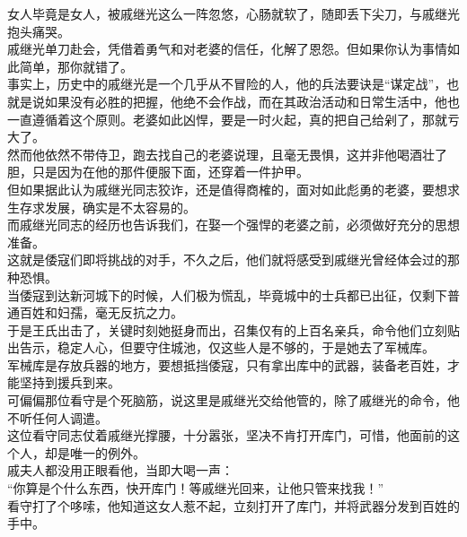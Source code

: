 \begin{multicols}{\theparacolNo}
女人毕竟是女人，被戚继光这么一阵忽悠，心肠就软了，随即丢下尖刀，与戚继光抱头痛哭。\\

戚继光单刀赴会，凭借着勇气和对老婆的信任，化解了恩怨。但如果你认为事情如此简单，那你就错了。\\

事实上，历史中的戚继光是一个几乎从不冒险的人，他的兵法要诀是“谋定战”，也就是说如果没有必胜的把握，他绝不会作战，而在其政治活动和日常生活中，他也一直遵循着这个原则。老婆如此凶悍，要是一时火起，真的把自己给剁了，那就亏大了。\\

然而他依然不带侍卫，跑去找自己的老婆说理，且毫无畏惧，这并非他喝酒壮了胆，只是因为在他的那件便服下面，还穿着一件护甲。\\

但如果据此认为戚继光同志狡诈，还是值得商榷的，面对如此彪勇的老婆，要想求生存求发展，确实是不太容易的。\\

而戚继光同志的经历也告诉我们，在娶一个强悍的老婆之前，必须做好充分的思想准备。\\

这就是倭寇们即将挑战的对手，不久之后，他们就将感受到戚继光曾经体会过的那种恐惧。\\

当倭寇到达新河城下的时候，人们极为慌乱，毕竟城中的士兵都已出征，仅剩下普通百姓和妇孺，毫无反抗之力。\\

于是王氏出击了，关键时刻她挺身而出，召集仅有的上百名亲兵，命令他们立刻贴出告示，稳定人心，但要守住城池，仅这些人是不够的，于是她去了军械库。\\

军械库是存放兵器的地方，要想抵挡倭寇，只有拿出库中的武器，装备老百姓，才能坚持到援兵到来。\\

可偏偏那位看守是个死脑筋，说这里是戚继光交给他管的，除了戚继光的命令，他不听任何人调遣。\\

这位看守同志仗着戚继光撑腰，十分嚣张，坚决不肯打开库门，可惜，他面前的这个人，却是唯一的例外。\\

戚夫人都没用正眼看他，当即大喝一声：\\

“你算是个什么东西，快开库门！等戚继光回来，让他只管来找我！”\\

看守打了个哆嗦，他知道这女人惹不起，立刻打开了库门，并将武器分发到百姓的手中。\\


\end{multicols}
